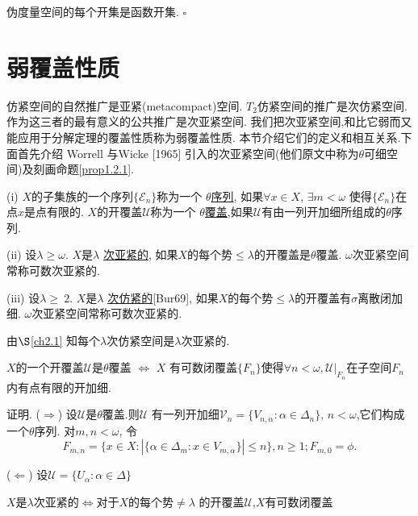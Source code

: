 \documentclass[main.tex]{subfiles}
\begin{document}
\begin{fact}
伪度量空间的每个开集是函数开集. $\square$
\end{fact}

\section{弱覆盖性质}\label{ch1.2}
仿紧空间的自然推广是亚紧(metacompact)空间.
$T_2$仿紧空间的推广是次仿紧空间.
作为这三者的最有意义的公共推广是次亚紧空间.
我们把次亚紧空间,和比它弱而又能应用于分解定理的覆盖性质称为弱覆盖性质.
本节介绍它们的定义和相互关系.下面首先介绍 Worrell 与Wicke [1965] 引入的次亚紧空间(他们原文中称为$\theta$可细空间)及刻画命题\ref{prop1.2.1}.


\begin{definition}
\textnormal{(i)} $X$的子集族的一个序列$\{\mathscr{E}_n\}$称为一个
\underline{$\theta$序列},
如果$\forall x\in X$, $ \exists m < \omega$ 使得$\{\mathscr{E}_n\}$在点$x$是点有限的.
$X$的开覆盖$\mathscr{U}$称为一个 \underline{$\theta$覆盖},如果$\mathscr{U}$有由一列开加细所组成的$\theta$序列.

\textnormal{(ii)} 设$\lambda\ge\omega$. $X$是$\lambda$ \underline{次亚紧的},
如果$X$的每个势$\le\lambda$的开覆盖是$\theta$覆盖.
$\omega$次亚紧空间常称可数次亚紧的.


\textnormal{(iii)} 设$\lambda\ge\ 2$. $X$是$\lambda$ \underline{次仿紧的}\textnormal{[Bur69]},
如果$X$的每个势$\le\lambda$的开覆盖有$\sigma$离散闭加细.
$\omega$次亚紧空间常称可数次亚紧的.
\end{definition}

由$\S$\ref{ch2.1} 知每个$\lambda$次仿紧空间是$\lambda$次亚紧的.

\begin{proposition}\label{prop1.2.1}
$X$的一个开覆盖$\mathscr{U}$是$\theta$覆盖 $\Leftrightarrow$
$X$ 有可数闭覆盖$\{F_n\}$使得$\forall n < \omega, \mathscr{U}|_{F_n}$在子空间${F_n}$内有点有限的开加细.
\end{proposition}

证明. ($\Rightarrow$) 设$\mathscr{U}$是$\theta$覆盖.则$\mathscr{U}$
有一列开加细$\mathscr{V}_n = \{V_{n,\alpha}: \alpha\in \Delta_n\}$,
$n<\omega$,它们构成一个$\theta$序列.
对$m,n<\omega$, 令
$$F_{m,n}=\{x\in X: |\{\alpha\in\Delta_m: x\in V_{m,\alpha}\}|\le n\}, n\ge 1; F_{m,0} = \phi.$$

($\Leftarrow$) 设$\mathscr{U} = \{ U_\alpha: \alpha\in\Delta\}$

\begin{corollary}
	$X$是$\lambda$次亚紧的$\Leftrightarrow$对于$X$的每个势$\ne\lambda$
	的开覆盖$\mathscr{U}$,$X$有可数闭覆盖
\end{corollary}
\end{document}
